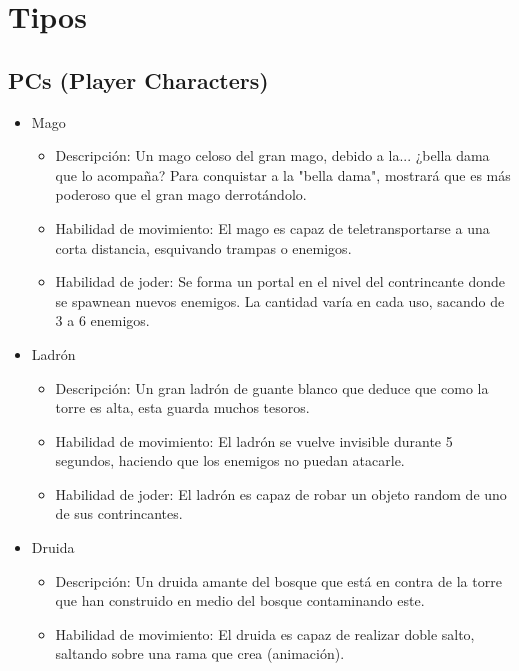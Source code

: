 \section{Tipos} %

\subsection{PCs (Player Characters)} %

\begin{itemize} %
    \item Mago       %
    \begin{itemize}
        \item Descripción: Un mago celoso del gran mago, debido a la... ¿bella dama que lo acompaña? Para conquistar a la "bella dama", mostrará que es más poderoso que el gran mago derrotándolo.
        \item Habilidad de movimiento: El mago es capaz de teletransportarse a una corta distancia, esquivando trampas o enemigos.
        \item Habilidad de joder: Se forma un portal en el nivel del contrincante donde se spawnean nuevos enemigos. La cantidad varía en cada uso, sacando de 3 a 6 enemigos.
    \end{itemize}
    \item Ladrón      %
    \begin{itemize}
        \item Descripción: Un gran ladrón de guante blanco que deduce que como la torre es alta, esta guarda muchos tesoros.
        \item Habilidad de movimiento: El ladrón se vuelve invisible durante 5 segundos, haciendo que los enemigos no puedan atacarle.
        \item Habilidad de joder: El ladrón es capaz de robar un objeto random de uno de sus contrincantes.
    \end{itemize}
    \item Druida     %
    \begin{itemize}
        \item Descripción: Un druida amante del bosque que está en contra de la torre que han construido en medio del bosque contaminando este.
        \item Habilidad de movimiento: El druida es capaz de realizar doble salto, saltando sobre una rama que crea (animación).

\end{itemize}
\end{itemize}
